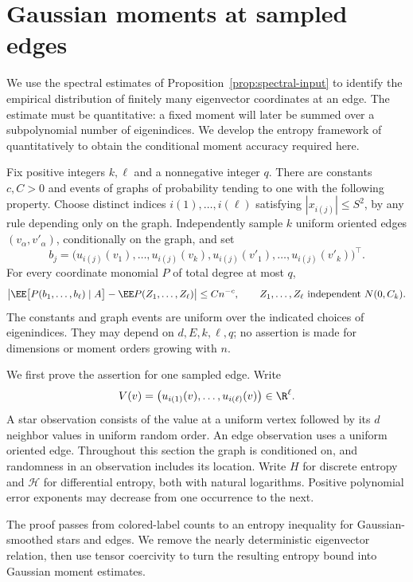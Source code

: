 \section{Gaussian moments at sampled edges}\label{sec:entropy}

We use the spectral estimates of Proposition~\ref{prop:spectral-input}
to identify the empirical distribution of finitely many eigenvector
coordinates at an edge. The estimate must be quantitative: a fixed
moment will later be summed over a subpolynomial number of eigenindices.
We develop the entropy framework of \citet{BackhauszSzegedy}
quantitatively to obtain the conditional moment accuracy required here.

\begin{proposition}\label{prop:edge-moments}
Fix positive integers \(k,\ell\) and a nonnegative integer \(q\).
There are constants \(c,C>0\) and events of graphs of probability tending
to one with the following property. Choose distinct indices
\(i(1),\ldots,i(\ell)\) satisfying \(|x_{i(j)}|\le S^2\), by any rule
depending only on the graph. Independently sample \(k\) uniform oriented
edges \((v_\alpha,v'_\alpha)\), conditionally on the graph, and set
\[
 b_j=\bigl(u_{i(j)}(v_1),\ldots,u_{i(j)}(v_k),
           u_{i(j)}(v'_1),\ldots,u_{i(j)}(v'_k)\bigr)^\top .
\]
For every coordinate monomial \(P\) of total degree at most \(q\),
\[
 \left|\EE\bigl[P(b_1,\ldots,b_\ell)\mid A\bigr]
       -\EE P(Z_1,\ldots,Z_\ell)\right|\le Cn^{-c},
 \qquad Z_1,\ldots,Z_\ell\ \text{independent }N(0,C_k).
\]
The constants and graph events are uniform over the indicated choices
of eigenindices. They may depend on \(d,E,k,\ell,q\); no assertion is
made for dimensions or moment orders growing with \(n\).
\end{proposition}

We first prove the assertion for one sampled edge. Write
\[
 V(v)=\bigl(u_{i(1)}(v),\ldots,u_{i(\ell)}(v)\bigr)\in\R^\ell.
\]
A star observation consists of the value at a uniform vertex followed
by its \(d\) neighbor values in uniform random order. An edge observation
uses a uniform oriented edge. Throughout this section the graph is
conditioned on, and randomness in an observation includes its location.
Write \(H\) for discrete entropy and \(\mathcal H\) for differential
entropy, both with natural logarithms. Positive polynomial error
exponents may decrease from one occurrence to the next.

The proof passes from colored-label counts to an entropy inequality
for Gaussian-smoothed stars and edges. We remove the nearly
deterministic eigenvector relation, then use tensor coercivity to turn
the resulting entropy bound into Gaussian moment estimates.


